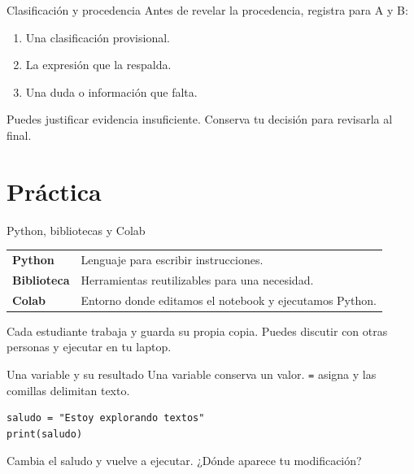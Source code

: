 \begin{frame}[label=decision-manual]{Clasificación y procedencia}
  Antes de revelar la procedencia, registra para A y B:
  \begin{enumerate}
    \item Una clasificación provisional.
    \item La expresión que la respalda.
    \item Una duda o información que falta.
  \end{enumerate}
  \par\vspace{0.3cm}
  Puedes justificar evidencia insuficiente. Conserva tu decisión para revisarla al final.
\end{frame}

\section{Práctica}

\begin{frame}[label=entorno]{Python, bibliotecas y Colab}
  \renewcommand{\arraystretch}{1.4}
  \begin{tabular}{@{}p{}p{}@{}}
    \textbf{Python} & Lenguaje para escribir instrucciones.\\
    \textbf{Biblioteca} & Herramientas reutilizables para una necesidad.\\
    \textbf{Colab} & Entorno donde editamos el notebook y ejecutamos Python.\\
  \end{tabular}\par
  \par\vspace{0.4cm}
  Cada estudiante trabaja y guarda su propia copia. Puedes discutir con otras personas y ejecutar en tu laptop.
\end{frame}

\begin{frame}[fragile,label=primera-celda]{Una variable y su resultado}
  Una variable conserva un valor. \texttt{=} asigna y las comillas delimitan texto.
  \begin{verbatim}
saludo = "Estoy explorando textos"
print(saludo)
  \end{verbatim}\par
  Cambia el saludo y vuelve a ejecutar. ¿Dónde aparece tu modificación?
\end{frame}

